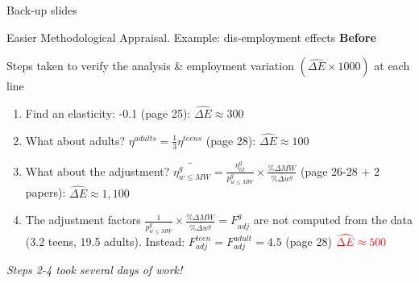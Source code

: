 \documentclass{beamer}
\def\red{\color{red}}
\newcommand{\backupbegin}{
   \newcounter{finalframe}
   \setcounter{finalframe}{\value{framenumber}}
}
\begin{document}
\appendix

\begin{frame}[noframenumbering]
\begin{center}
Back-up slides
\end{center}
\end{frame}








\backupbegin



\begin{frame}[label=before]{Easier Methodological Appraisal. Example: dis-employment effects \textbf{Before}}


Steps taken to verify the analysis \&  employment variation $(\widehat{\Delta E}\times 1000)$ at each line\footnotemark 

 

\begin{enumerate}
\pause
\item Find an elasticity: -0.1 (page 25): {\red $\widehat{\Delta E} \approx 300$ }
\pause
\item What about adults? $\eta^{adults}=\frac{1}{3}\eta^{teens}$ (page 28):  {\red $\widehat{\Delta E} \approx 100$  } 
\pause
\item What about the adjustment? $\widetilde{ \eta^{g}_{w\leq MW} } =  \frac{\eta^{g}_{lit}}{p^{g}_{w\leq MW}} \times \frac{\%\Delta MW}{\overline{\%\Delta w^{g}}}$ (page 26-28 + 2 papers):   {\red $\widehat{\Delta E} \approx 1,100$  } 
\pause
\item The adjustment factors $\frac{1}{p^{g}_{w\leq MW}} \times \frac{\%\Delta MW}{\overline{\%\Delta w^{g}}} = F^{g}_{adj}$ are not computed from the data (3.2 teens, 19.5 adults). Instead: $F^{teen}_{adj} = F^{adult}_{adj}= 4.5$ (page 28) ${\red\widehat{\Delta E} \approx 500}$   
\end{enumerate}
\textit{Steps 2-4 took several days of work! }
\small{\hyperlink{map_cbo}{\beamerbutton{}}}
\end{frame}
\end{document}
